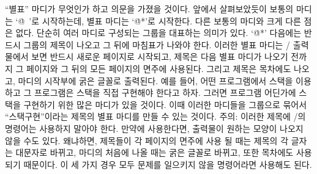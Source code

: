 ``별표'' 마디가 무엇인가 하고 의문을 가졌을 것이다. 앞에서
살펴보았듯이 보통의 마디는 `\.{@\ }'로 시작하는데, 별표 마디는
`\.{@*}'로 시작한다. 다른 보통의 마디와 크게 다른 점은 없다. 단순히
여러 마디로 구성되는 그룹을 대표하는 의미가 있다. `\.{@*}'
다음에는 반드시 그룹의 제목이 나오고 그 뒤에 마침표가 나와야
한다. 이러한 별표 마디는 \TEX/ 출력물에서 보면 반드시 새로운 페이지로
시작되고, 제목은 다음 별표 마디가 나오기 전까지 그 페이지와 그 뒤의
모든 페이지의 면주에 사용된다. 그리고 제목은 목차에도 나오고,
마디의 시작부에 굵은 글꼴로 출력된다. 예를 들어, 어떤
프로그램에서 스택을 이용하고 그 프로그램은 스택을 직접 구현해야 한다고
하자. 그러면 프로그램 어딘가에 스택을 구현하기 위한 많은 마디가 있을
것이다. 이때 이러한 마디들을 그룹으로 묶어서 ``스택구현''이라는
제목의 별표 마디를 만들 수 있는 것이다. 주의: 이러한 제목에 \TEX/의
명령어는 사용하지 말아야 한다. 만약에 사용한다면, 출력물이 
원하는 모양이 나오지 않을 수도 있다. 왜냐하면, 제목들이 각 페이지의
면주에 사용 될 때는 제목의 각 글자는 대문자로 바뀌고, 마디의
처음에 나올 때는 굵은 글꼴로 바뀌고, 또한 목차에도 사용되기
때문이다. 이 세 가지 경우 모두 문제를 일으키지 않을 명령어라면 사용해도 된다.

